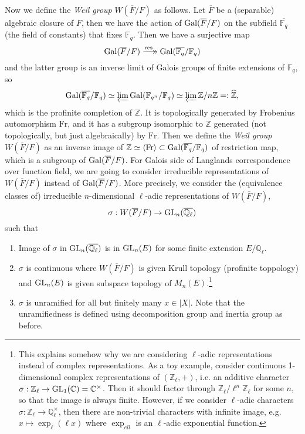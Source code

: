 Now we define the \emph{Weil group} $W(\overline{F}/F)$ as follows.
Let $\overline{F}$ be a (separable) algebraic closure of $F$, then we have the action 
of $\operatorname{\mathrm{Gal}}(\overline{F}/F)$ on the subfield $\overline{\mathbb{F}_{q}}$ (the field of constants) that fixes $\mathbb{F}_{q}$.
Then we have a surjective map 
$$\operatorname{\mathrm{Gal}}(\overline{F}/F) \xrightarrow[]{\mathrm{res}}\mathrel{\mkern-14mu}\rightarrow \operatorname{\mathrm{Gal}}(\overline{\mathbb{F}_{q}}/\mathbb{F}_{q})$$
and the latter group is an inverse limit of Galois groups of finite extensions of $\mathbb{F}_{q}$, so
$$
\operatorname{\mathrm{Gal}}(\overline{\mathbb{F}_{q}}/\mathbb{F}_{q}) \simeq \varprojlim \operatorname{\mathrm{Gal}}(\mathbb{F}_{q^{n}} / \mathbb{F}_{q}) \simeq \varprojlim \mathbb{Z}/n\mathbb{Z} =: \widehat{\mathbb{Z}},
$$
which is the profinite completion of $\mathbb{Z}$.
It is topologically generated by Frobenius automorphism $\mathrm{Fr}$, and it has a subgroup isomorphic to $\mathbb{Z}$ generated (not topologically, but just algebraically) by $\mathrm{Fr}$.
Then we define the \emph{Weil group} $W(\overline{F}/F)$ as an inverse image of $\mathbb{Z} \simeq \langle \mathrm{Fr} \rangle \subset \operatorname{\mathrm{Gal}}(\overline{\mathbb{F}_{q}} / \mathbb{F}_{q})$
of restriction map, which is a subgroup of $\operatorname{\mathrm{Gal}}(\overline{F}/F)$.
For Galois side of Langlands correspondence over function field, we are going to consider irreducible representations of
$W(\overline{F}/F)$ instead of $\operatorname{\mathrm{Gal}}(\overline{F}/F)$.
More precisely, we consider the (equivalence classes of) irreducible $n$-dimensional $\ell$-adic representations of $W(\overline{F}/F)$,
$$
\sigma: W(\overline{F}/F) \to \operatorname{\mathrm{GL}}_{n}(\overline{\mathbb{Q}_{\ell}})
$$
such that 
\begin{enumerate}
    \item Image of $\sigma$ in $\operatorname{\mathrm{GL}}_{n}(\overline{\mathbb{Q}_{\ell}})$ is in $\operatorname{\mathrm{GL}}_{n}(E)$ for some finite extension $E/\mathbb{Q}_{\ell}$.
    \item $\sigma$ is continuous where $W(\overline{F}/F)$ is given Krull topology (profinite toppology) and $\operatorname{\mathrm{GL}}_{n}(E)$ is given subspace topology of $M_{n}(E)$.\footnote{
        This explains somehow why we are considering $\ell$-adic representations instead of complex representations.
        As a toy example, consider continuous 1-dimensional complex representations of $(\mathbb{Z}_{\ell}, +)$, i.e. an additive character $\sigma: \mathbb{Z}_{\ell} \to \operatorname{\mathrm{GL}}_{1}(\mathbb{C}) = \mathbb{C}^{\times}$.
        Then it should factor through $\mathbb{Z}_{\ell} / \ell^{n}\mathbb{Z}_{\ell}$ for some $n$, so that the image is always finite.
        However, if we consider $\ell$-adic characters $\sigma:\mathbb{Z}_{\ell} \to \mathbb{Q}_{\ell}^{\times}$, then there are non-trivial characters with infinite image, e.g. $x \mapsto \exp_{\ell}(\ell x)$ 
        where $\exp_{ell}$ is an $\ell$-adic exponential function.
    }
    \item $\sigma$ is unramified for all but finitely many $x \in |X|$.
    Note that the unramifiedness is defined using decomposition group and inertia group as before.
\end{enumerate}

